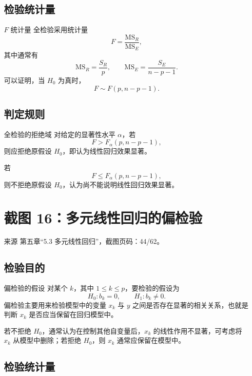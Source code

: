 \documentclass[UTF8,zihao=-4,fontset=fandol]{ctexart}
\begin{document}
\subsection{检验统计量}

\begin{keybox}{$F$ 统计量}
全检验采用统计量
\[
F=\frac{\mathrm{MS}_R}{\mathrm{MS}_E},
\]
其中通常有
\[
\mathrm{MS}_R=\frac{S_R}{p},
\qquad
\mathrm{MS}_E=\frac{S_E}{n-p-1}.
\]
可以证明，当 $H_0$ 为真时，
\[
F\sim F(p,n-p-1).
\]
\end{keybox}

\subsection{判定规则}

\begin{methodbox}{全检验的拒绝域}
对给定的显著性水平 $\alpha$，若
\[
F>F_{\alpha}(p,n-p-1),
\]
则应拒绝原假设 $H_0$，即认为线性回归效果显著。

若
\[
F\le F_{\alpha}(p,n-p-1),
\]
则不拒绝原假设 $H_0$，认为尚不能说明线性回归效果显著。
\end{methodbox}

\section{截图 16：多元线性回归的偏检验}

\begin{sourcebox}{来源}
第五章“5.3 多元线性回归”，截图页码：44/62。
\end{sourcebox}

\subsection{检验目的}

\begin{keybox}{偏检验的假设}
对某个 $k$，其中 $1\le k\le p$，要检验的假设为
\[
H_0:b_k=0,
\qquad
H_1:b_k\ne 0.
\]
偏检验主要用来检验模型中的变量 $x_k$ 与 $y$ 之间是否存在显著的相关关系，也就是判断 $x_k$ 是否应当保留在回归模型中。

若不拒绝 $H_0$，通常认为在控制其他自变量后，$x_k$ 的线性作用不显著，可考虑将 $x_k$ 从模型中删除；若拒绝 $H_0$，则 $x_k$ 通常应保留在模型中。
\end{keybox}

\subsection{检验统计量}
\end{document}
